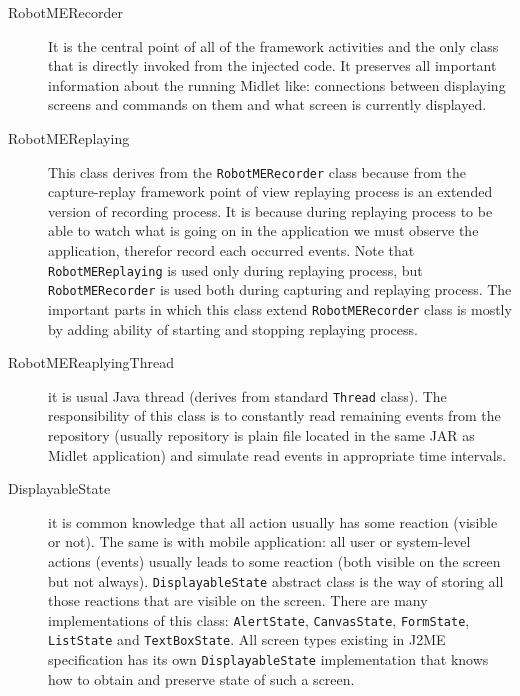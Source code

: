 \begin{description}
\item[RobotMERecorder] It is the central point of all of the framework activities and the only class
that is directly invoked from the injected code. It preserves all important information
about  the running Midlet like: connections between displaying screens and commands on them
and what screen is currently displayed.

\item[RobotMEReplaying] This class derives from the \texttt{RobotMERecorder} class because from the
capture-replay framework point of view replaying process is an extended version of recording process.
It is because during replaying process to be able to watch what is going on in the application
we must observe the application, therefor record each occurred events. Note that \texttt{RobotMEReplaying}
is used only during replaying process, but \texttt{RobotMERecorder} is used both during capturing
and replaying process. The important parts in which this class extend \texttt{RobotMERecorder} class
is mostly by adding ability of starting and stopping replaying process.

\item[RobotMEReaplyingThread] it is usual Java thread (derives from standard \texttt{Thread} class).
The responsibility of this class is to constantly read remaining events from the repository
(usually repository is plain file located in the same JAR as Midlet application) and simulate read events in
appropriate time intervals.

\item[DisplayableState] it is common knowledge that all action usually has some reaction (visible or not).
The same is with mobile application: all user or system-level actions (events) usually leads to some
reaction (both visible on the screen but not always). \texttt{DisplayableState} abstract class is the
way of storing all those reactions that are visible on the screen. There are many implementations
of this class: \texttt{AlertState}, \texttt{CanvasState}, \texttt{FormState}, 
\texttt{ListState} and \texttt{TextBoxState}. All screen
types existing in J2ME specification has its own \texttt{DisplayableState} implementation that
knows how to obtain and preserve state of such a screen.


\end{description}
